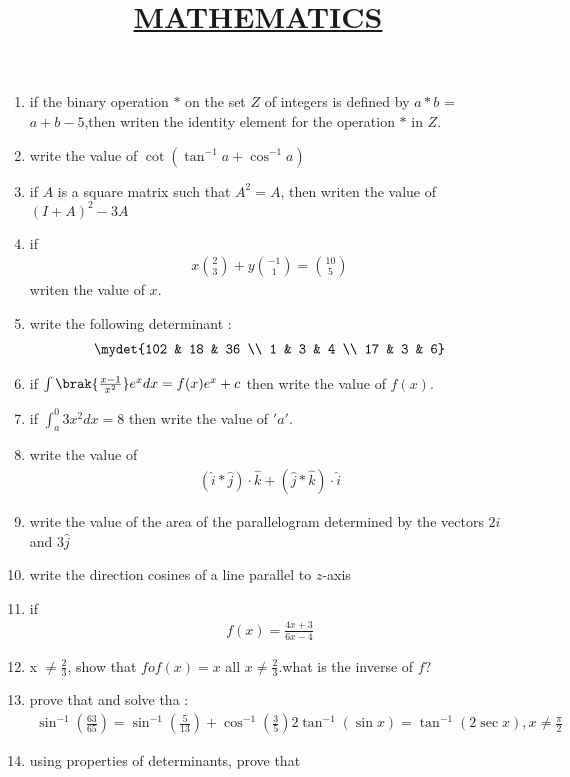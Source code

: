\documentclass{article}
\title{\underline{MATHEMATICS}}
\date{}
\begin{document}
\maketitle
\begin{enumerate}
\item if the binary operation $*$ on the  set $Z$ of integers is defined by $ a*b $ = $a + b - 5$,then writen the identity element for the operation $*$ in $Z$.
\item write the value of $\cot(\tan^{-1}a + \cos^{-1}a)$
\item if $A$ is a square matrix such that $ A^2 = A$, then writen the value of ${(I+A)}^2-3A$
\item if
\begin{align*} x \binom{2}{3} + y \binom{-1}{1} = \binom{10}{5}
\end{align*}
writen the value of $x$.
\item write the following determinant : \begin{align*}
\mydet{102 & 18 & 36 \\ 1 & 3 & 4 \\ 17 & 3 & 6}
\end{align*}
\item if $\int\brak{\frac{x-1}{x^2}}e^{x}dx= f(x)e^{x}+c$ then write the value of $f(x)$.
\item if $\int_{a}^{0} 3x^{2}dx = 8$ then write the value of $ 'a' $.
\item write the value of 
	\begin{align*}
	(\hat{i} * \hat{j} )\cdot\hat{k}+(\hat{j} * \hat{k})\cdot\hat{i}
\end{align*}
\item write the value of the area of the parallelogram determined by the vectors $2\hat{i}$ and $3\hat{j}$
\item write the direction cosines of a line parallel to $z$-axis
\item if
\begin{align*} 
f(x) = \frac{4x+3}{6x-4}
\end{align*}
\item x $\neq\frac{2}{3}$, show that $fof(x) = x$ all $x \neq \frac{2}{3}$.what is the inverse of $f?$
\item prove that and solve tha :
\begin{align*}
	\sin^{-1}(\frac{63}{65}) = \sin^{-1}(\frac{5}{13}) + \cos^{-1}(\frac{3}{5}) 
	2\tan^{-1}(\sin x)=\tan^{-1}(2 \sec x), x \neq \frac{\pi}{2} 
\end{align*}
\item using properties of determinants, prove that

\end{enumerate}
\end{document}

